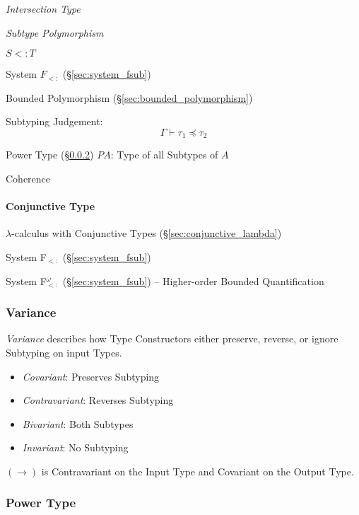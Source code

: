 \emph{Intersection Type}

\emph{Subtype Polymorphism}

$S <: T$

System $F_{<:}$ (\S\ref{sec:system_fsub})

Bounded Polymorphism (\S\ref{sec:bounded_polymorphism})

Subtyping Judgement:
\[
  \Gamma \vdash \tau_1 \preceq \tau_2
\]

Power Type (\S\ref{sec:power_type}) $P A$: Type of all Subtypes of $A$

Coherence



\paragraph{Conjunctive Type}\label{sec:conjunctive_type}\hfill

$\lambda$-calculus with Conjunctive Types
(\S\ref{sec:conjunctive_lambda})

System F$_{<:}$ (\S\ref{sec:system_fsub})

System F$_{<:}^\omega$ (\S\ref{sec:system_fsub}) -- Higher-order
Bounded Quantification



\subsubsection{Variance}\label{sec:type_variance}

\emph{Variance} describes how Type Constructors either preserve,
reverse, or ignore Subtyping on input Types.

\begin{itemize}
  \item \emph{Covariant}: Preserves Subtyping
  \item \emph{Contravariant}: Reverses Subtyping
  \item \emph{Bivariant}: Both Subtypes
  \item \emph{Invariant}: No Subtyping
\end{itemize}

$(\rightarrow)$ is Contravariant on the Input Type and Covariant on
the Output Type.



\subsubsection{Power Type}\label{sec:power_type}

